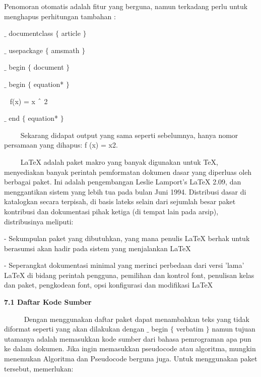 \vspace{12pt}
Penomoran otomatis adalah fitur yang berguna, namun terkadang perlu untuk menghapus perhitungan tambahan :\par

{\fontsize{10pt}{10pt}\selectfont  $ \_ $ documentclass $ \{ $ article $ \} $ }\par

{\fontsize{10pt}{10pt}\selectfont  $ \_ $ usepackage $ \{ $ amsmath $ \} $ }\par

{\fontsize{10pt}{10pt}\selectfont  $ \_ $ begin $ \{ $ document $ \} $ }\par

{\fontsize{10pt}{10pt}\selectfont  $ \_ $ begin $ \{ $ equation* $ \} $ }\par

{\fontsize{10pt}{10pt}\selectfont ~ f(x) = x $ \string^ $ 2}\par

{\fontsize{10pt}{10pt}\selectfont  $ \_ $ end $ \{ $ equation* $ \} $ }\par

\vspace{12pt}
~~~~ Sekarang didapat output yang sama seperti sebelumnya, hanya nomor persamaan yang dihapus: f (x) = x2.\par
~~~~ LaTeX adalah paket makro yang banyak digunakan untuk TeX, menyediakan banyak perintah pemformatan dokumen dasar yang diperluas oleh berbagai paket. Ini adalah pengembangan Leslie Lamport's LaTeX 2.09, dan menggantikan sistem yang lebih tua pada bulan Juni 1994. Distribusi dasar di katalogkan secara terpisah, di basis lateks selain dari sejumlah besar paket kontribusi dan dokumentasi pihak ketiga (di tempat lain pada arsip), distribusinya meliputi: \par

- Sekumpulan paket yang dibutuhkan, yang mana penulis LaTeX berhak untuk berasumsi akan hadir pada sistem yang menjalankan LaTeX \par

- Seperangkat dokumentasi minimal yang merinci perbedaan dari versi 'lama' LaTeX di bidang perintah pengguna, pemilihan dan kontrol font, penulisan kelas dan paket, pengkodean font, opsi konfigurasi dan modifikasi LaTeX \par

\vspace{12pt}
\noindent \textbf{7.1 Daftar Kode Sumber}\par
\noindent ~~~~~ Dengan menggunakan daftar paket dapat menambahkan teks yang tidak diformat seperti yang akan dilakukan dengan  $ \_ $  begin  $ \{ $ verbatim $ \} $  namun tujuan utamanya adalah memasukkan kode sumber dari bahasa pemrograman apa pun ke dalam dokumen. Jika ingin memasukkan pseudocode atau algoritma, mungkin menemukan Algoritma dan Pseudocode berguna juga. Untuk menggunakan paket tersebut, memerlukan: 


